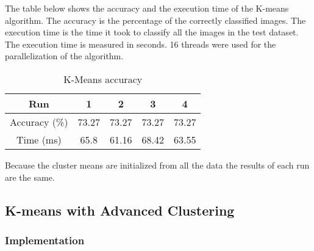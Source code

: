 The table below shows the accuracy and the execution time of the K-means algorithm. The accuracy is the percentage of the correctly
classified images. The execution time is the time it took to classify all the images in the test dataset. The execution time is measured
in seconds. 16 threads were used for the parallelization of the algorithm.


\begin{center}
    \begin{table}[h]
        \centering
        \begin{tabular}{|c|c|c|c|c|}
            \hline
            Run & 1 & 2 & 3 & 4 \\
            \hline
            Accuracy (\%) & 73.27 & 73.27 & 73.27 & 73.27 \\
            \hline
            Time (ms) & 65.8 & 61.16 & 68.42 & 63.55 \\
            \hline
        \end{tabular}
        \caption{K-Means accuracy}
        \label{tab:kmeans}
    \end{table}
    \end{center}

Because the cluster means are initialized from all the data the results of each run are the same.

\subsection*{K-means with Advanced Clustering}
\subsubsection{Implementation}

